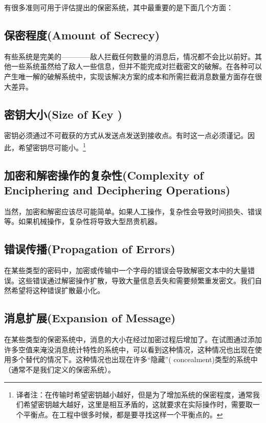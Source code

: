 \documentclass[]{article}
\begin{document}
有很多准则可用于评估提出的保密系统，其中最重要的是下面几个方面：

\subsection{保密程度(Amount of Secrecy)}
有些系统是完美的————敌人拦截任何数量的消息后，情况都不会比以前好。其他一些系统虽然给了敌人一些信息，但并不能完成对拦截密文的破解。在各种可以产生唯一解的破解系统中，实现该解决方案的成本和所需拦截消息数量方面存在很大差异。

\subsection{密钥大小(Size of Key )}

密钥必须通过不可截获的方式从发送点发送到接收点。有时这一点必须谨记。因此，希望密钥尽可能小。\footnote{译者注：在传输时希望密钥越小越好，但是为了增加系统的保密程度，通常我们希望密钥越大越好，这里是相互矛盾的，这就要求在实际操作时，需要取一个平衡点。在工程中很多时候，都是要寻找这样一个平衡点的。}

\subsection{加密和解密操作的复杂性(Complexity of Enciphering and Deciphering Operations)}

当然，加密和解密应该尽可能简单。如果人工操作，复杂性会导致时间损失、错误等。如果机械操作，复杂性将导致大型昂贵机器。

\subsection{错误传播(Propagation of Errors)}

在某些类型的密码中，加密或传输中一个字母的错误会导致解密文本中的大量错误。这些错误通过解密操作扩散，导致大量信息丢失和需要频繁重发密文。我们自然希望将这种错误扩散最小化。

\subsection{消息扩展(Expansion of Message)}
在某些类型的保密系统中，消息的大小在经过加密过程后增加了。在试图通过添加许多空值来淹没消息统计特性的系统中，可以看到这种情况，这种情况也出现在使用多个替代的情况下。这种情况也出现在许多“隐藏”( concealment)类型的系统中（通常不是我们定义的保密系统）。

\newpage
%   
%
\end{document}
